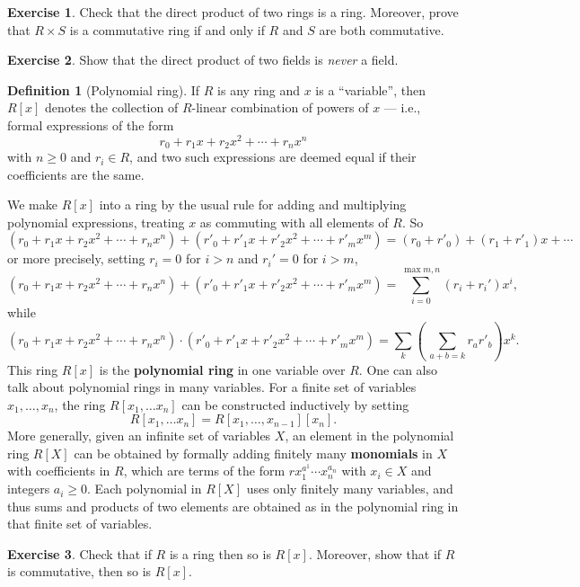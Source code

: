 \documentclass[12pt]{report}
\numberwithin{equation}{section}
\numberwithin{theorem}{chapter}
\theoremstyle{definition}
\newtheorem{definition}[theorem]{Definition}
\newtheorem{exercise}{Exercise}
\newtheorem*{basic properties}{Basic Properties}
\newtheorem*{Important Remark}{Important Remark}
\newcommand{\df}[1]{{\bf #1}\index{#1}}
\begin{document}
\begin{exercise}
	Check that the direct product of two rings is a ring. Moreover, prove that $R \times S$ is a commutative ring if and only if $R$ and $S$ are both commutative.
\end{exercise}


\begin{exercise}
	Show that the direct product of two fields is \emph{never} a field.
\end{exercise}



\begin{definition}[Polynomial ring]
	If $R$ is any ring and $x$ is a ``variable'', then $R[x]$ denotes the collection of $R$-linear combination of powers of $x$ --- i.e., formal expressions of the form
  $$
  r_0 + r_1x + r_2x^2 + \cdots + r_nx^n
  $$
  with $n \geqslant 0$ and $r_i \in R$, and two such expressions are deemed equal if their coefficients are the same.

We make $R[x]$ into a ring by the usual rule for adding and multiplying polynomial expressions, treating $x$ as commuting with all elements of $R$. So
$$(r_0 + r_1x + r_2x^2 + \cdots + r_nx^n) + (r'_0 + r'_1x + r'_2x^2 + \cdots + r'_mx^m) = (r_0 + r'_0) + (r_1+ r'_1)x  + \cdots$$
or more precisely, setting $r_i = 0$ for $i>n$ and $r_i'=0$ for $i>m$,
$$(r_0 + r_1x + r_2x^2 + \cdots + r_nx^n) + (r'_0 + r'_1x + r'_2x^2 + \cdots + r'_mx^m) = \sum_{i=0}^{\max{m,n}} (r_i+r_i') x^i,$$
while
$$(r_0 + r_1x + r_2x^2 + \cdots + r_nx^n) \cdot (r'_0 + r'_1x + r'_2x^2 + \cdots + r'_mx^m) = \sum_{k} \left( \, \sum_{a+b = k} r_ar'_b \right) x^k.$$
This ring $R[x]$ is the \df{polynomial ring} in one variable over $R$. One can also talk about polynomial rings in many variables. For a finite set of variables $x_1, \ldots, x_n$, the ring $R[x_1, \ldots x_n]$ can be constructed inductively by setting
$$R[x_1, \ldots x_n] = R[x_1, \ldots, x_{n-1}][x_n].$$
More generally, given an infinite set of variables $X$, an element in the polynomial ring $R[X]$ can be obtained by formally adding finitely many \df{monomials} in $X$ with coefficients in $R$, which are terms of the form $rx_1^{a^1} \cdots x_n^{a_n}$ with $x_i \in X$ and integers $a_i \geqslant 0$. Each polynomial in $R[X]$ uses only finitely many variables, and thus sums and products of two elements are obtained as in the polynomial ring in that finite set of variables.
\end{definition}



\begin{exercise}
	Check that if $R$ is a ring then so is $R[x]$. Moreover, show that if $R$ is commutative, then so is $R[x]$.
\end{exercise}
\end{document}
